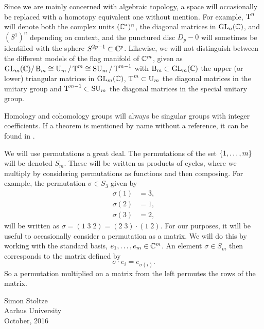 Since we are mainly concerned with algebraic topology, a space will
occasionally be replaced with a homotopy equivalent one without
mention. For example, $\operatorname{T}^n$ will denote both the complex units
$(\mathbb{C}^*)^n$, the
diagonal matrices in $\operatorname{GL}_n(\mathbb{C})$, and $(S^1)^n$ depending
on context, and
the
punctured disc $D_p-0$ will sometimes be identified with the sphere
$S^{2p-1} \subset \mathbb{C}^p$. Likewise, we will not distinguish between the
different models of the flag manifold of $\mathbb{C}^m$, given as $\operatorname{GL}_{m}(\mathbb{C})/\operatorname{B}_{m}
\cong \operatorname{U}_{m}/\operatorname{T}^{m} \cong \operatorname{SU}_{m}/\operatorname{T}^{m-1}$ with $\operatorname{B}_m \subset \operatorname{GL}_m(\mathbb{C})$ the upper (or
lower) triangular matrices in $\operatorname{GL}_m(\mathbb{C})$, $\operatorname{T}^m \subset \operatorname{U}_m$ the
diagonal
matrices in the unitary group and $\operatorname{T}^{m-1}\subset \operatorname{SU}_m$ the diagonal
matrices in the special unitary group.

Homology and cohomology groups will always be singular groups
with integer coefficients. If a theorem is mentioned by name without a
reference, it can be found in \cite{hatcher}.

We will use permutations a great deal. The permutations of the set
$\left\{ 1,\dots,m \right\}$ will be denoted $S_m$.
These will be written as products of cycles, where we multiply by
considering permutations as functions and then composing. For
example, the
permutation $\sigma\in S_3$ given by
\begin{align*}
  \sigma(1) &= 3, \\
  \sigma(2) &= 1, \\
  \sigma(3) &= 2,
\end{align*}
will be written as $\sigma = (1 \; 3 \; 2) = (2\; 3)\cdot (1\; 2)$.
For our purposes, it will be useful to occasionally consider
a permutation as a matrix. We will do this by working with the
standard
basis, $e_1,\dots,e_m\in \mathbb{C}^m$. An element $\sigma \in S_m$ then
corresponds to the matrix defined by
\[ \sigma \cdot e_i = e_{\sigma(i)}. \]
So a permutation multiplied on a matrix from the left permutes the
rows of the matrix.


\vspace{5em}
\begin{flushright}
  Simon Stoltze \\
  Aarhus University\\
  October, 2016
\end{flushright}




